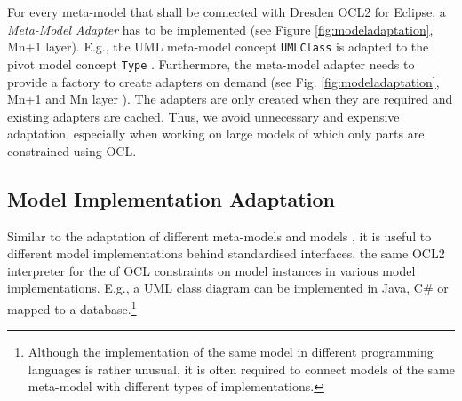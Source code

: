 	For every meta-model that shall be connected with Dresden OCL2 for Eclipse, 
	a \textit{Meta-Model Adapter} has to be implemented (see Figure \ref{fig:modeladaptation}, Mn+1 layer). 
	 E.g., the UML
	meta-model concept \texttt{UMLClass} is adapted to the pivot model concept
	\texttt{Type} . Furthermore, the meta-model adapter
	needs to provide a factory to create adapters on demand (see Fig.
	\ref{fig:modeladaptation}, Mn+1 and Mn layer ).
	The  adapters are only created when they are required and
	existing adapters are cached. Thus, we avoid unnecessary and expensive adaptation, 
	especially when working on large models of which only parts are constrained using OCL.


\subsection{Model Implementation Adaptation}
	
	Similar to the adaptation of different meta-models and models , it is
	useful to  different model implementations
	 behind standardised interfaces. the same OCL2 interpreter for the  of OCL constraints on model instances in various model
	implementations.  E.g., a UML class diagram can be
	implemented in Java, C\# or mapped to a database.\footnote{ Although the implementation of the same model in different
	programming languages is rather unusual, it is often required to connect models 
	of the same meta-model with different types of implementations.} 
	
